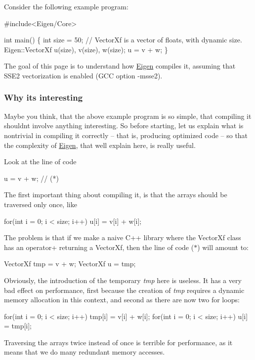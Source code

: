 Consider the following example program\+:


\begin{DoxyCode}
\textcolor{preprocessor}{#include<Eigen/Core>}

\textcolor{keywordtype}{int} main()
\{
  \textcolor{keywordtype}{int} size = 50;
  \textcolor{comment}{// VectorXf is a vector of floats, with dynamic size.}
  Eigen::VectorXf u(size), v(size), w(size);
  u = v + w;
\}
\end{DoxyCode}


The goal of this page is to understand how \hyperlink{namespace_eigen}{Eigen} compiles it, assuming that S\+S\+E2 vectorization is enabled (G\+CC option -\/msse2).\hypertarget{_topic_inside_eigen_example_WhyInteresting}{}\subsubsection{Why it\textquotesingle{}s interesting}\label{_topic_inside_eigen_example_WhyInteresting}
Maybe you think, that the above example program is so simple, that compiling it shouldn\textquotesingle{}t involve anything interesting. So before starting, let us explain what is nontrivial in compiling it correctly -- that is, producing optimized code -- so that the complexity of \hyperlink{namespace_eigen}{Eigen}, that we\textquotesingle{}ll explain here, is really useful.

Look at the line of code 
\begin{DoxyCode}
u = v + w;   \textcolor{comment}{//   (*)}
\end{DoxyCode}


The first important thing about compiling it, is that the arrays should be traversed only once, like 
\begin{DoxyCode}
\textcolor{keywordflow}{for}(\textcolor{keywordtype}{int} i = 0; i < size; i++) u[i] = v[i] + w[i];
\end{DoxyCode}
 The problem is that if we make a naive C++ library where the Vector\+Xf class has an operator+ returning a Vector\+Xf, then the line of code ($\ast$) will amount to\+: 
\begin{DoxyCode}
VectorXf tmp = v + w;
VectorXf u = tmp;
\end{DoxyCode}
 Obviously, the introduction of the temporary {\itshape tmp} here is useless. It has a very bad effect on performance, first because the creation of {\itshape tmp} requires a dynamic memory allocation in this context, and second as there are now two for loops\+: 
\begin{DoxyCode}
\textcolor{keywordflow}{for}(\textcolor{keywordtype}{int} i = 0; i < size; i++) tmp[i] = v[i] + w[i];
\textcolor{keywordflow}{for}(\textcolor{keywordtype}{int} i = 0; i < size; i++) u[i] = tmp[i];
\end{DoxyCode}
 Traversing the arrays twice instead of once is terrible for performance, as it means that we do many redundant memory accesses.

